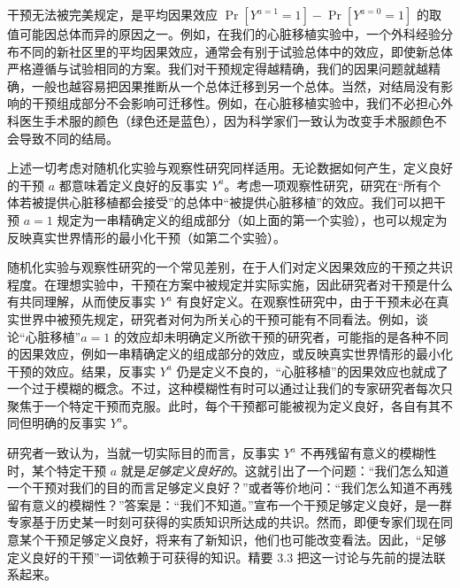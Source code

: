 干预无法被完美规定，是平均因果效应 $\Pr[Y^{a=1}=1]-\Pr[Y^{a=0}=1]$ 的取值可能因总体而异的原因之一。例如，在我们的心脏移植实验中，一个外科经验分布不同的新社区里的平均因果效应，通常会有别于试验总体中的效应，即使新总体严格遵循与试验相同的方案。我们对干预规定得越精确，我们的因果问题就越精确，一般也越容易把因果推断从一个总体迁移到另一个总体。当然，对结局没有影响的干预组成部分不会影响可迁移性。例如，在心脏移植实验中，我们不必担心外科医生手术服的颜色（绿色还是蓝色），因为科学家们一致认为改变手术服颜色不会导致不同的结局。


上述一切考虑对随机化实验与观察性研究同样适用。无论数据如何产生，定义良好的干预 $a$ 都意味着定义良好的反事实 $Y^{a}$。考虑一项观察性研究，研究在“所有个体若被提供心脏移植都会接受”的总体中“被提供心脏移植”的效应。我们可以把干预 $a=1$ 规定为一串精确定义的组成部分（如上面的第一个实验），也可以规定为反映真实世界情形的最小化干预（如第二个实验）。

随机化实验与观察性研究的一个常见差别，在于人们对定义因果效应的干预之共识程度。在理想实验中，干预在方案中被规定并实际实施，因此研究者对干预是什么有共同理解，从而使反事实 $Y^{a}$ 有良好定义。在观察性研究中，由于干预未必在真实世界中被预先规定，研究者对何为所关心的干预可能有不同看法。例如，谈论“心脏移植”$a=1$ 的效应却未明确定义所欲干预的研究者，可能指的是各种不同的因果效应，例如一串精确定义的组成部分的效应，或反映真实世界情形的最小化干预的效应。结果，反事实 $Y^{a}$ 仍是定义不良的，“心脏移植”的因果效应也就成了一个过于模糊的概念。不过，这种模糊性有时可以通过让我们的专家研究者每次只聚焦于一个特定干预而克服。此时，每个干预都可能被视为定义良好，各自有其不同但明确的反事实 $Y^{a}$。

研究者一致认为，当就一切实际目的而言，反事实 $Y^{a}$ 不再残留有意义的模糊性时，某个特定干预 $a$ 就是\emph{足够定义良好的}。这就引出了一个问题：“我们怎么知道一个干预对我们的目的而言足够定义良好？”或者等价地问：“我们怎么知道不再残留有意义的模糊性？”答案是：“我们不知道。”宣布一个干预足够定义良好，是一群专家基于历史某一时刻可获得的实质知识所达成的共识。然而，即便专家们现在同意某个干预足够定义良好，将来有了新知识，他们也可能改变看法。因此，“足够定义良好的干预”一词依赖于可获得的知识。精要 3.3 把这一讨论与先前的提法联系起来。

